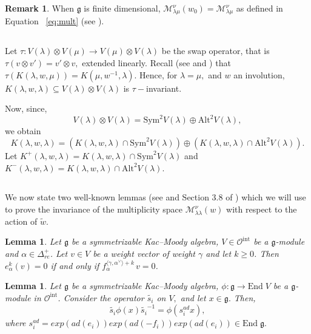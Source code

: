 \documentclass[12pt,reqno]{amsart}
\theoremstyle{plain}
\newtheorem{lemma}[theorem]{Lemma}
\theoremstyle{definition}
\newtheorem{rem}[theorem]{Remark}
\theoremstyle{plain}
\newcommand{\posreal}[1][+]{\Delta_{re}^{#1}}
\newcommand{\catoint}{\mathcal{O}^{\mathrm{int}}}
\newcommand{\lie}{\mathfrak}
\begin{document}
\begin{rem}\label{rem:mult}
    When $\lie g$ is finite dimensional, $\mathcal{M}_{\lambda\mu}^\nu(w_0)=\mathcal{M}_{\lambda\mu}^\nu$ as defined in Equation ~\eqref{eq:mult} (see \cite{MRV}).
\end{rem}

\subsection{}

Let $\tau: V(\lambda)\otimes V(\mu)\to V(\mu)\otimes V(\lambda)$ be  the swap operator, that is $\tau(v\otimes v')=v'\otimes v,$ extended linearly. Recall (see \cite{KRV} and \cite{KRV2}) that $\tau(K(\lambda,w,\mu))=K(\mu,w^{-1},\lambda).$ Hence, for $\lambda=\mu,$ and $w$ an involution, $K(\lambda,w,\lambda)\subseteq V(\lambda)\otimes V(\lambda)$ is $\tau-$invariant.

Now, since, $$V(\lambda)\otimes V(\lambda)=\text{Sym}^2V(\lambda)\oplus \text{Alt}^2V(\lambda),$$ we obtain $$K(\lambda, w, \lambda)= (K(\lambda, w, \lambda)\cap \text{Sym}^2V(\lambda)) \oplus (K(\lambda, w, \lambda)\cap \text{Alt}^2V(\lambda)).$$ 
Let $K^{+}(\lambda,w, \lambda)=K(\lambda, w, \lambda)\cap \text{Sym}^2V(\lambda)$ and $K^{-}(\lambda,w, \lambda)=K(\lambda, w, \lambda)\cap \text{Alt}^2V(\lambda).$

\subsection{}
We now state two well-known lemmas (see \cite{Hum1} and Section 3.8 of \cite{Kac}) which we will use to prove the invariance of the multiplicity space $\mathcal{M}_{\lambda\lambda}^\nu(w)$ with respect to the action of $\widetilde{w}.$

\begin{lemma}\label{lem:sl2string}
Let $\mathfrak{g}$ be a symmetrizable Kac--Moody algebra, $V \in \catoint$ be a $\mathfrak{g}$-module and $\alpha \in \posreal$. Let $v \in V$ be a weight vector of weight $\gamma$ and let $k \geq 0$. Then $e_\alpha^k(v) =0$ if and only if $f_\alpha^{\langle \gamma, \alpha^\vee \rangle + k}\, v =0$.
\end{lemma}

\begin{lemma}
Let $\mathfrak{g}$ be a symmetrizable Kac--Moody algebra, $\phi: \lie g \to \text{End}\;V$ be a $\mathfrak{g}$-module in $\catoint$. Consider the operator $\widetilde{s_i}$ on $V,$ and let $x \in \lie g.$ Then, $$\widetilde{s_i}\phi(x)\widetilde{s_i}^{-1}=\phi(s_i^{ad}x),$$ where $s_i^{ad}= exp(ad(e_i))exp(ad(-f_i))exp(ad(e_i))\in \text{End}\; \lie g.$
\end{lemma}
\end{document}
